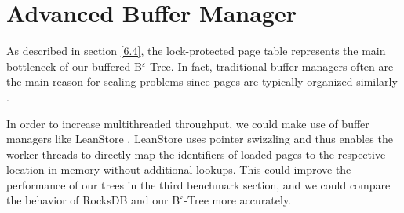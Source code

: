 \section{Advanced Buffer Manager}

As described in section \ref{6.4}, the lock-protected page table represents the main bottleneck of our buffered B$^\varepsilon$-Tree. In fact, traditional buffer managers often are the main reason for scaling problems since pages are typically organized similarly \cite{buffer_managers,hashtable_buffer_slow}.

In order to increase multithreaded throughput, we could make use of buffer managers like LeanStore \cite{leanstore}. LeanStore uses pointer swizzling and thus enables the worker threads to directly map the identifiers of loaded pages to the respective location in memory without additional lookups. This could improve the performance of our trees in the third benchmark section, and we could compare the behavior of RocksDB and our B$^\varepsilon$-Tree more accurately.



